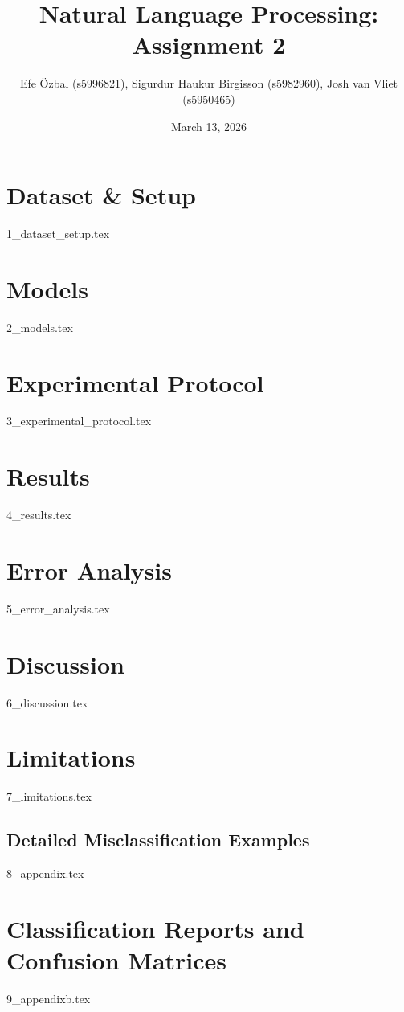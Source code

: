 \documentclass{article}
\title{\textbf{Natural Language Processing: Assignment 2}}
\author{Efe Özbal (s5996821), Sigurdur Haukur Birgisson (s5982960), Josh van Vliet (s5950465)}
\date{March 13, 2026}
\begin{document}
\maketitle

\section{Dataset \& Setup}
\label{sec:dataset}
{1_dataset_setup.tex}



\section{Models}
{2_models.tex}

\section{Experimental Protocol}
{3_experimental_protocol.tex}

\section{Results}
\label{sec:results}
{4_results.tex}

\section{Error Analysis}
{5_error_analysis.tex}

\section{Discussion}
{6_discussion.tex}

\section{Limitations}
{7_limitations.tex}



\newpage

\appendix
\newpage
{}
\begin{landscape}
\section{Detailed Misclassification Examples}
\label{app:misclass}
{8_appendix.tex}

\clearpage

\end{landscape}
\restoregeometry

\section{Classification Reports and Confusion Matrices}
\label{app:reports}
{9_appendixb.tex}
\end{document}
